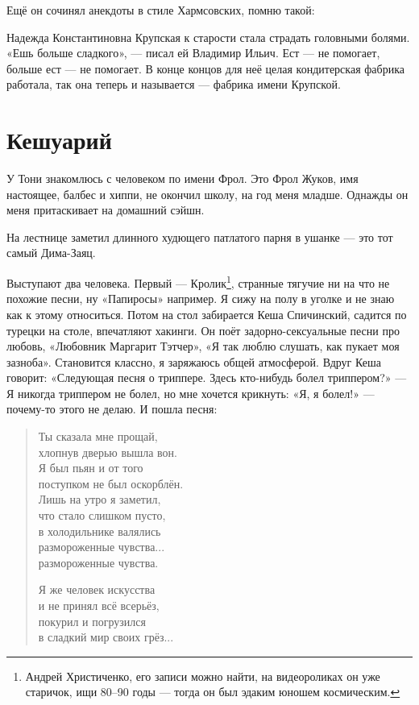 \documentclass{book}
\begin{document}
Ещё он сочинял анекдоты в стиле Хармсовских, помню такой:

Надежда Константиновна Крупская к старости стала страдать головными болями.
«Ешь больше сладкого», --- писал ей Владимир Ильич.
Ест --- не помогает, больше ест --- не помогает.
В конце концов для неё целая кондитерская фабрика работала, так она теперь и называется --- фабрика имени Крупской.




\section*{Кешуарий}

У Тони знакомлюсь с человеком по имени Фрол.
Это Фрол Жуков, имя настоящее, балбес и хиппи, не окончил школу, на год меня младше.
Однажды он меня притаскивает на домашний сэйшн.

На лестнице заметил длинного худющего патлатого парня в ушанке 
--- это тот самый Дима-Заяц.

Выступают два человека.
Первый --- Кролик\footnote{Андрей Христиченко, его записи можно найти, на видеороликах он уже старичок, ищи 80--90 годы --- тогда он был эдаким юношем космическим.},
странные тягучие ни на что не похожие песни, ну «Папиросы» например.
Я сижу на полу в уголке и не знаю как к этому относиться.
Потом на стол забирается Кеша Спичинский, садится по турецки на столе,
впечатляют хакинги.
Он поёт задорно-сексуальные песни про любовь,
«Любовник Маргарит Тэтчер», 
«Я так люблю слушать, как пукает моя зазноба».
Становится классно, я заряжаюсь общей атмосферой.
Вдруг Кеша говорит: «Следующая песня о триппере.
Здесь кто-нибудь болел триппером?» --- Я никогда триппером не болел, но мне хочется крикнуть: «Я, я болел!» --- почему-то этого не делаю.
И пошла песня:

\begin{verse}
Ты сказала мне прощай,\\
\quad хлопнув дверью вышла вон.\\
Я был пьян и от того\\
\quad 
поступком не был оскорблён.\\
Лишь на утро я заметил,\\
\quad 
что стало слишком пусто,\\
в холодильнике валялись \\
\quad 
размороженные чувства...\\
\quad \quad размороженные чувства.

Я же человек искусства\\
\quad 
и не принял всё всерьёз,\\
покурил и погрузился\\
\quad 
в сладкий мир своих грёз...
\end{verse}
\end{document}
